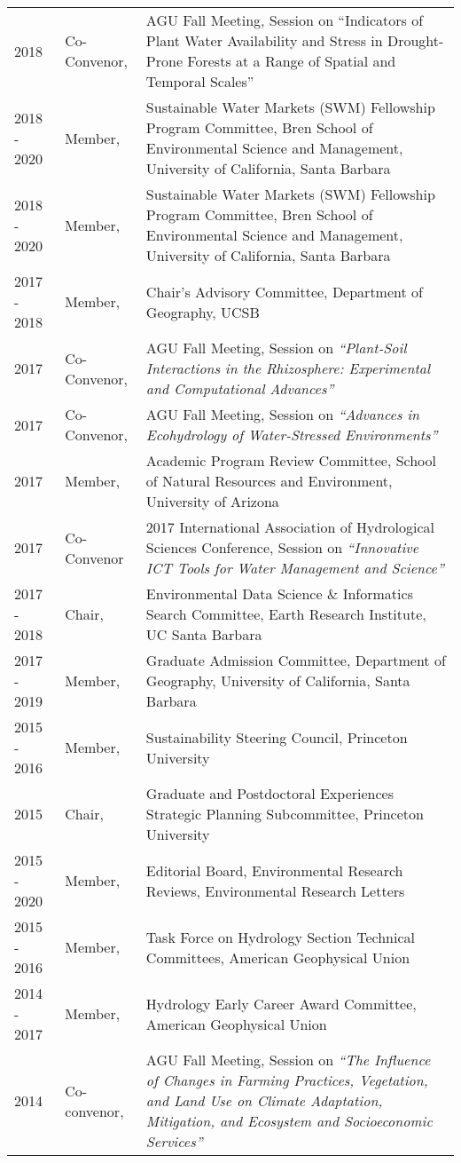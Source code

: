 \documentclass[10pt]{report}
\begin{document}
\begin{longtable}{p{.75in} p{1.1in} p{4.2in}}
2018 & Co-Convenor, & AGU Fall Meeting, Session on “Indicators of Plant Water Availability and Stress in Drought-Prone Forests at a Range of Spatial and Temporal Scales” \\
2018 - 2020 & Member, & Sustainable Water Markets (SWM) Fellowship Program Committee, Bren School of Environmental Science and Management, University of California, Santa Barbara \\
2018 - 2020 & Member, & Sustainable Water Markets (SWM) Fellowship Program Committee, Bren School of Environmental Science and Management, University of California, Santa Barbara \\
2017 - 2018 & Member, & Chair’s Advisory Committee, Department of Geography, UCSB \\
2017 & Co-Convenor, & AGU Fall Meeting, Session on \emph{``Plant-Soil Interactions in the Rhizosphere: Experimental and Computational Advances''} \\
2017 & Co-Convenor, & AGU Fall Meeting, Session on \emph{``Advances in Ecohydrology of Water-Stressed Environments''} \\
2017 & Member, & Academic Program Review Committee, School of Natural Resources and Environment, University of Arizona \\
2017 & Co-Convenor & 2017 International Association of Hydrological Sciences Conference, Session on \emph{``Innovative ICT Tools for Water Management and Science''} \\
2017 - 2018 & Chair, & Environmental Data Science \& Informatics Search Committee, Earth Research Institute, UC Santa Barbara \\ 
2017 - 2019 & Member, & Graduate Admission Committee, Department of Geography, University of California, Santa Barbara \\
2015 - 2016 & Member, & Sustainability Steering Council, Princeton University \\ 
2015 & Chair, & Graduate and Postdoctoral Experiences Strategic Planning Subcommittee, Princeton University \\
2015 - 2020 & Member, & Editorial Board, Environmental Research Reviews, Environmental Research Letters \\ 
2015 - 2016 & Member, & Task Force on Hydrology Section Technical Committees, American Geophysical Union \\ 
2014 - 2017 & Member, & Hydrology Early Career Award Committee, American Geophysical Union \\
2014 & Co-convenor, & AGU Fall Meeting, Session on \emph{``The Influence of Changes in Farming Practices, Vegetation, and Land Use on Climate Adaptation, Mitigation, and Ecosystem and Socioeconomic Services''}\\

\end{longtable}
\end{document}
